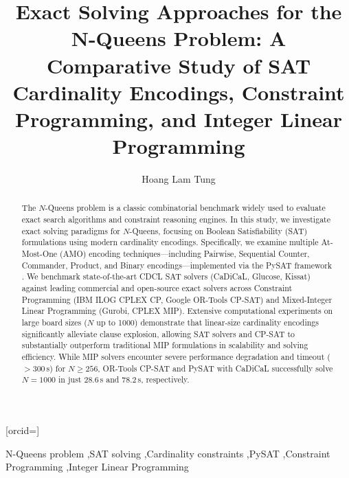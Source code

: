 \documentclass[a4paper,fleqn]{cas-sc}
\begin{document}
\let\WriteBookmarks\relax
\def\floatpagepagefraction{1}
\def\textpagefraction{.001}


\title [mode = title]{Exact Solving Approaches for the N-Queens Problem: A Comparative Study of SAT Cardinality Encodings, Constraint Programming, and Integer Linear Programming}

\author[1]{Hoang Lam Tung}[orcid=]
\cormark[cor1]

\address[1]{Faculty of Information Technology, VNU University of Engineering and Technology, 144 Xuan Thuy, Cau Giay, Hanoi, Vietnam}


\begin{abstract}
The $N$-Queens problem is a classic combinatorial benchmark widely used to evaluate exact search algorithms and constraint reasoning engines. In this study, we investigate exact solving paradigms for $N$-Queens, focusing on Boolean Satisfiability (SAT) formulations using modern cardinality encodings. Specifically, we examine multiple At-Most-One (AMO) encoding techniques—including Pairwise, Sequential Counter, Commander, Product, and Binary encodings—implemented via the PySAT framework \cite{ignatiev2018pysat}. We benchmark state-of-the-art CDCL SAT solvers (CaDiCaL, Glucose, Kissat) against leading commercial and open-source exact solvers across Constraint Programming (IBM ILOG CPLEX CP, Google OR-Tools CP-SAT) and Mixed-Integer Linear Programming (Gurobi, CPLEX MIP). Extensive computational experiments on large board sizes ($N$ up to 1000) demonstrate that linear-size cardinality encodings significantly alleviate clause explosion, allowing SAT solvers and CP-SAT to substantially outperform traditional MIP formulations in scalability and solving efficiency. While MIP solvers encounter severe performance degradation and timeout ($>300$\,s) for $N \ge 256$, OR-Tools CP-SAT and PySAT with CaDiCaL successfully solve $N = 1000$ in just $28.6$\,s and $78.2$\,s, respectively.
\end{abstract}

\begin{keywords}
N-Queens problem \sep SAT solving \sep Cardinality constraints \sep PySAT \sep Constraint Programming \sep Integer Linear Programming
\end{keywords}
\end{document}
